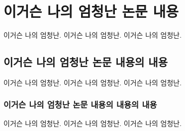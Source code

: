 \section{이거슨 나의 엄청난 논문 내용}
이거슨 나의 엄청난. 이거슨 나의 엄청난. 이거슨 나의 엄청난.

\subsection{이거슨 나의 엄청난 논문 내용의 내용}
이거슨 나의 엄청난. 이거슨 나의 엄청난. 이거슨 나의 엄청난.

\subsubsection{이거슨 나의 엄청난 논문 내용의 내용의 내용}
이거슨 나의 엄청난. 이거슨 나의 엄청난. 이거슨 나의 엄청난.